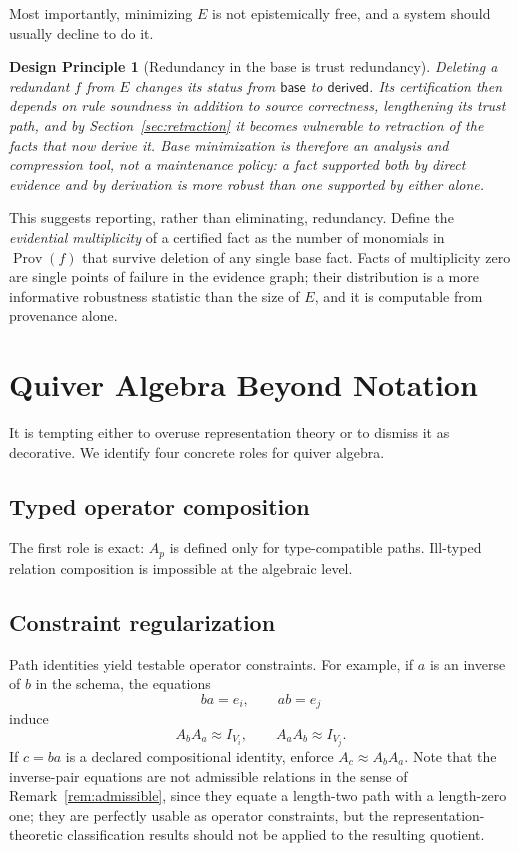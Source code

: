 \documentclass[11pt]{article}
\newtheorem{principle}[definition]{Design Principle}
\newcommand{\Prov}{\operatorname{Prov}}
\begin{document}
Most importantly, minimizing $E$ is not epistemically free, and a system should usually decline to do it.

\begin{principle}[Redundancy in the base is trust redundancy]
\label{prin:redundancy}
Deleting a redundant $f$ from $E$ changes its status from $\mathsf{base}$ to $\mathsf{derived}$. Its certification then depends on rule soundness in addition to source correctness, lengthening its trust path, and by Section~\ref{sec:retraction} it becomes vulnerable to retraction of the facts that now derive it. Base minimization is therefore an analysis and compression tool, not a maintenance policy: a fact supported both by direct evidence and by derivation is more robust than one supported by either alone.
\end{principle}

This suggests reporting, rather than eliminating, redundancy. Define the \emph{evidential multiplicity} of a certified fact as the number of monomials in $\Prov(f)$ that survive deletion of any single base fact. Facts of multiplicity zero are single points of failure in the evidence graph; their distribution is a more informative robustness statistic than the size of $E$, and it is computable from provenance alone.

\section{Quiver Algebra Beyond Notation}

It is tempting either to overuse representation theory or to dismiss it as decorative. We identify four concrete roles for quiver algebra.

\subsection{Typed operator composition}
The first role is exact: $A_p$ is defined only for type-compatible paths. Ill-typed relation composition is impossible at the algebraic level.

\subsection{Constraint regularization}
\label{sec:constraint-reg}
Path identities yield testable operator constraints. For example, if $a$ is an inverse of $b$ in the schema, the equations
\[
ba=e_i,\qquad ab=e_j
\]
induce
\[
A_bA_a\approx I_{V_i},\qquad A_aA_b\approx I_{V_j}.
\]
If $c=ba$ is a declared compositional identity, enforce $A_c\approx A_bA_a$. Note that the inverse-pair equations are not admissible relations in the sense of Remark~\ref{rem:admissible}, since they equate a length-two path with a length-zero one; they are perfectly usable as operator constraints, but the representation-theoretic classification results should not be applied to the resulting quotient.
\end{document}
